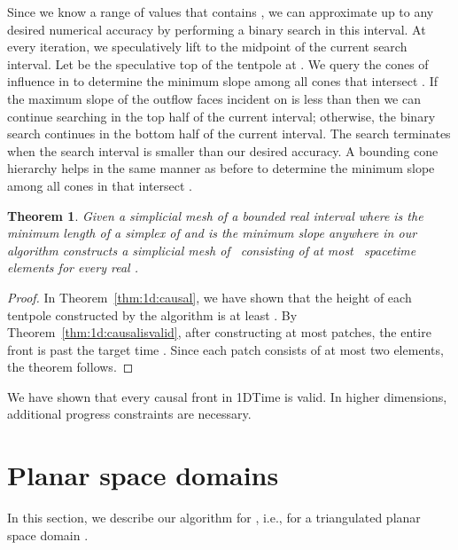 \documentclass[twocolumn]{article}
\newtheorem{theorem}[lemma]{Theorem}
\begin{document}
Since we know a range of values 
that contains , we can approximate
 up to any desired numerical accuracy by performing
a binary search in this interval.  At every iteration, we
speculatively lift  to the midpoint of the current search
interval.  Let  be the speculative top of the tentpole at
.  We query the cones of influence in
 to determine the minimum slope
 among all cones that intersect .  If
the maximum slope of the outflow faces incident on  is less
than  then we can continue searching in the top
half of the current interval; otherwise, the binary search continues
in the bottom half of the current interval.  The search terminates
when the search interval is smaller than our desired accuracy.  A
bounding cone hierarchy helps in the same manner as before to
determine the minimum slope among all cones in
 that intersect .



\begin{theorem}
  Given a simplicial mesh  of a bounded real interval where
   is the minimum length of a simplex of  and  is
  the minimum slope anywhere in  our algorithm
  constructs a simplicial mesh of~ consisting of at
  most~ spacetime elements for every real .
\label{thm:1d:main}
\end{theorem}
\begin{proof}
  In Theorem~\ref{thm:1d:causal}, we have shown that the height of
  each tentpole constructed by the algorithm is at least .  By Theorem~\ref{thm:1d:causalisvalid}, after
  constructing at most  patches, the entire front  is past the target time
  .  Since each patch consists of at most two elements, the theorem
  follows.
\end{proof}


We have shown that every causal front in 1DTime is valid.  In
higher dimensions, additional progress constraints are necessary.









\section{Planar space domains}
\label{sec:2d}

In this section, we describe our algorithm for , i.e., for a
triangulated planar space domain .
\end{document}
